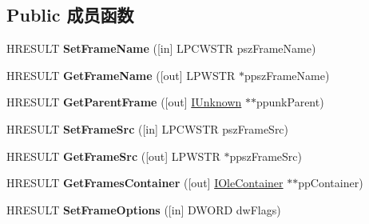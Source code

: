 \subsection*{Public 成员函数}
\begin{DoxyCompactItemize}
\item 
\mbox{\label{interface_i_target_frame2_af955233bf5f9bb1b892eaa49da83141b}} 
H\+R\+E\+S\+U\+LT {\bfseries Set\+Frame\+Name} (\mbox{[}in\mbox{]} L\+P\+C\+W\+S\+TR psz\+Frame\+Name)
\item 
\mbox{\label{interface_i_target_frame2_a12c92274c70c1646e71f69575c712064}} 
H\+R\+E\+S\+U\+LT {\bfseries Get\+Frame\+Name} (\mbox{[}out\mbox{]} L\+P\+W\+S\+TR $\ast$ppsz\+Frame\+Name)
\item 
\mbox{\label{interface_i_target_frame2_a5bf6ec07c948e794dcd3990eed7de091}} 
H\+R\+E\+S\+U\+LT {\bfseries Get\+Parent\+Frame} (\mbox{[}out\mbox{]} \hyperlink{interface_i_unknown}{I\+Unknown} $\ast$$\ast$ppunk\+Parent)
\item 
\mbox{\label{interface_i_target_frame2_ab49e40c8b50a1e56b84751ccd9eb4a67}} 
H\+R\+E\+S\+U\+LT {\bfseries Set\+Frame\+Src} (\mbox{[}in\mbox{]} L\+P\+C\+W\+S\+TR psz\+Frame\+Src)
\item 
\mbox{\label{interface_i_target_frame2_a930f677cb05482b4803ba7c016aef28b}} 
H\+R\+E\+S\+U\+LT {\bfseries Get\+Frame\+Src} (\mbox{[}out\mbox{]} L\+P\+W\+S\+TR $\ast$ppsz\+Frame\+Src)
\item 
\mbox{\label{interface_i_target_frame2_a8e7f4d8ee5f87e02a0102e755f0cf652}} 
H\+R\+E\+S\+U\+LT {\bfseries Get\+Frames\+Container} (\mbox{[}out\mbox{]} \hyperlink{interface_i_ole_container}{I\+Ole\+Container} $\ast$$\ast$pp\+Container)
\item 
\mbox{\label{interface_i_target_frame2_ae58fb86a4c377f0340251d7e30fe6728}} 
H\+R\+E\+S\+U\+LT {\bfseries Set\+Frame\+Options} (\mbox{[}in\mbox{]} D\+W\+O\+RD dw\+Flags)
\item 
\mbox{\label{interface_i_target_frame2_a3ab44e84b5968bbb05b04bd672d932be}} 

\end{DoxyCompactItemize}
